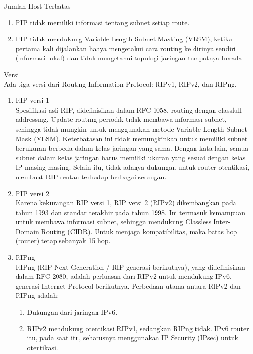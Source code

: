 \documentclass[a4paper,12pt]{article}
\begin{document}
Jumlah Host Terbatas\\
\begin{enumerate}
	\item RIP tidak memiliki informasi tentang subnet setiap route.
	
	\item RIP tidak mendukung Variable Length Subnet Masking (VLSM), ketika pertama kali dijalankan hanya mengetahui cara routing ke dirinya sendiri (informasi lokal) dan tidak mengetahui topologi jaringan tempatnya berada
\\
	
\end{enumerate}

Versi\\
Ada tiga versi dari Routing Information Protocol: RIPv1, RIPv2, dan RIPng.
\begin{enumerate}
	\item RIP versi 1\\
	Spesifikasi asli RIP, didefinisikan dalam RFC 1058, routing dengan classfull addressing. Update routing periodik tidak membawa informasi subnet, sehingga tidak mungkin untuk menggunakan metode Variable Length Subnet Mask (VLSM). Keterbatasan ini tidak memungkinkan untuk memiliki subnet berukuran berbeda dalam kelas jaringan yang sama. Dengan kata lain, semua subnet dalam kelas jaringan harus memiliki ukuran yang sesuai dengan kelas IP masing-masing. Selain itu, tidak adanya dukungan untuk router otentikasi, membuat RIP rentan terhadap berbagai serangan.
	\item RIP versi 2
\\
	Karena kekurangan RIP versi 1, RIP versi 2 (RIPv2) dikembangkan pada tahun 1993 dan standar terakhir pada tahun 1998. Ini termasuk kemampuan untuk membawa informasi subnet, sehingga mendukung Classless Inter-Domain Routing (CIDR). Untuk menjaga kompatibilitas, maka batas hop (router) tetap sebanyak 15 hop.
	\item RIPng\\
	RIPng (RIP Next Generation / RIP generasi berikutnya), yang didefinisikan dalam RFC 2080, adalah perluasan dari RIPv2 untuk mendukung IPv6, generasi Internet Protocol berikutnya. Perbedaan utama antara RIPv2 dan RIPng adalah:
	\begin{enumerate}[label=\alph*.]
		\item Dukungan dari jaringan IPv6.
		
		\item RIPv2 mendukung otentikasi RIPv1, sedangkan RIPng tidak. IPv6 router itu, pada saat itu, seharusnya menggunakan IP Security (IPsec) untuk otentikasi.
		

\end{enumerate}
\end{enumerate}
\end{document}
